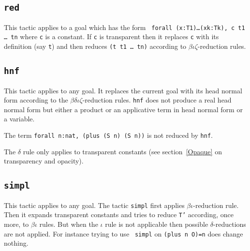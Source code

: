 \subsection{{\tt red}
}

This tactic applies to a goal which has the form {\tt
  forall (x:T1)\dots(xk:Tk), c t1 \dots\ tn} where {\tt c} is a constant.  If
{\tt c} is transparent then it replaces {\tt c} with its definition
(say {\tt t}) and then reduces {\tt (t t1 \dots\ tn)} according to
$\beta\iota\zeta$-reduction rules.

\begin{ErrMsgs}
\item {}
\end{ErrMsgs}

\subsection{{\tt hnf}
}

This tactic applies to any goal. It replaces the current goal with its
head normal form according to the $\beta\delta\iota\zeta$-reduction rules.
{\tt hnf} does not produce a real head normal form but either a
product or an applicative term in head normal form or a variable.

\Example
The term \verb+forall n:nat, (plus (S n) (S n))+ is not reduced by {\tt hnf}.

\Rem The $\delta$ rule only applies to transparent constants
(see section~\ref{Opaque} on transparency and opacity).

\subsection{\tt simpl
}

This tactic applies to any goal. The tactic {\tt simpl} first applies
$\beta\iota$-reduction rule.  Then it expands transparent constants
and tries to reduce {\tt T'} according, once more, to $\beta\iota$
rules. But when the $\iota$ rule is not applicable then possible
$\delta$-reductions are not applied.  For instance trying to use {\tt
  simpl} on {\tt (plus n O)=n} does change nothing.

